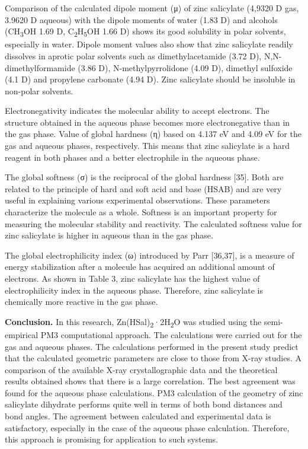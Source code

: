 \begin{multicols}{2}
Comparison of the calculated dipole moment (μ) of zinc salicylate
(4,9320 D gas, 3.9620 D aqueous) with the dipole moments of water (1.83
D) and alcohols (CH\textsubscript{3}OH 1.69 D,
C\textsubscript{2}H\textsubscript{5}OH 1.66 D) shows its good solubility
in polar solvents, especially in water. Dipole moment values also show
that zinc salicylate readily dissolves in aprotic polar solvents such as
dimethylacetamide (3.72 D), N,N-dimethylformamide (3.86 D),
N-methylpyrrolidone (4.09 D), dimethyl sulfoxide (4.1 D) and propylene
carbonate (4.94 D). Zinc salicylate should be insoluble in non-polar
solvents.

Electronegativity indicates the molecular ability to accept electrons.
The structure obtained in the aqueous phase becomes more electronegative
than in the gas phase. Value of global hardness (η) based on 4.137 eV
and 4.09 eV for the gas and aqueous phases, respectively. This means
that zinc salicylate is a hard reagent in both phases and a better
electrophile in the aqueous phase.

The global softness (σ) is the reciprocal of the global hardness
{[}35{]}. Both are related to the principle of hard and soft acid and
base (HSAB) and are very useful in explaining various experimental
observations. These parameters characterize the molecule as a whole.
Softness is an important property for measuring the molecular stability
and reactivity. The calculated softness value for zinc salicylate is
higher in aqueous than in the gas phase.

The global electrophilicity index (ω) introduced by Parr {[}36,37{]}, is
a measure of energy stabilization after a molecule has acquired an
additional amount of electrons. As shown in Table 3, zinc salicylate has
the highest value of electrophilicity index in the aqueous phase.
Therefore, zinc salicylate is chemically more reactive in the gas phase.

{\bfseries Conclusion.} In this research,
Zn(HSal)\textsubscript{2}·2H\textsubscript{2}O was studied using the
semi-empirical PM3 computational approach. The calculations were carried
out for the gas and aqueous phases. The calculations performed in the
present study predict that the calculated geometric parameters are close
to those from X-ray studies. A comparison of the available X-ray
crystallographic data and the theoretical results obtained shows that
there is a large correlation. The best agreement was found for the
aqueous phase calculations. PM3 calculation of the geometry of zinc
salicylate dihydrate performs quite well in terms of both bond distances
and bond angles. The agreement between calculated and experimental data
is satisfactory, especially in the case of the aqueous phase
calculation. Therefore, this approach is promising for application to
such systems.
\end{multicols}


